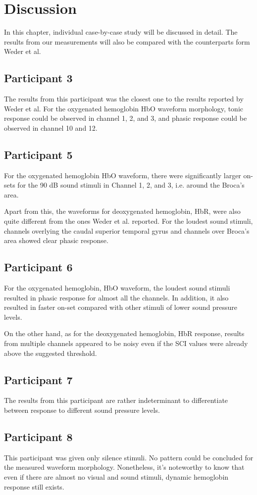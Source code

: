 \chapter{Discussion}
In this chapter, individual case-by-case study will be discussed in detail. The results from our measurements will also be compared with the counterparts form Weder et al.

\section {Participant 3}
The results from this participant was the closest one to the results reported by Weder et al. For the oxygenated hemoglobin HbO waveform morphology, tonic response could be observed in channel 1, 2, and 3, and phasic response could be observed in channel 10 and 12.

\section {Participant 5}
For the oxygenated hemoglobin HbO waveform, there were significantly larger on-sets for the 90 dB sound stimuli in Channel 1, 2, and 3, i.e. around the Broca's area.

Apart from this, the waveforms for deoxygenated hemoglobin, HbR, were also quite different from the ones Weder et al. reported. For the loudest sound stimuli, channels overlying the caudal superior temporal gyrus and channels over Broca's area showed clear phasic response. 

\section {Participant 6}

For the oxygenated hemoglobin, HbO waveform, the loudest sound stimuli resulted in phasic response for almost all the channels. In addition, it also resulted in faster on-set compared with other stimuli of lower sound pressure levels.

On the other hand, as for the deoxygenated hemoglobin, HbR response, results from multiple channels appeared to be noisy even if the SCI values were already above the suggested threshold.


\section {Participant 7}

The results from this participant are rather indeterminant to differentiate between response to different sound pressure levels.


\section {Participant 8}
This participant was given only silence stimuli. No pattern could be concluded for the measured waveform morphology. Nonetheless, it's noteworthy to know that even if there are almost no visual and sound stimuli, dynamic hemoglobin response still exists.